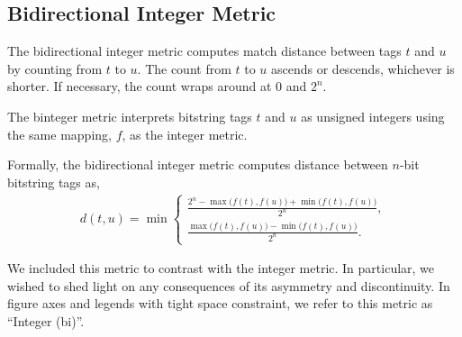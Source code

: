 \subsection{Bidirectional Integer Metric} \label{sec:bidirectionalinteger}

The bidirectional integer metric computes match distance between tags $t$ and $u$ by counting from $t$ to $u$.
The count from $t$ to $u$ ascends or descends, whichever is shorter.
If necessary, the count wraps around at $0$ and $2^n$.

The binteger metric interprets bitstring tags $t$ and $u$ as unsigned integers using the same mapping, $f$, as the integer metric.

Formally, the bidirectional integer metric computes distance between $n$-bit bitstring tags as,
\begin{align*}
d(t, u) =
\min
\begin{cases}
  \frac{2^n - \max\big(f(t), f(u)\big) + \min\big(f(t), f(u)\big)}{2^n}, \\
  \frac{\max\big(f(t), f(u)\big) - \min\big(f(t), f(u)\big)}{2^n}.
\end{cases}
\end{align*}

We included this metric to contrast with the integer metric. In particular, we wished to shed light on any consequences of its asymmetry and discontinuity.
In figure axes and legends with tight space constraint, we refer to this metric as ``Integer (bi)''.
